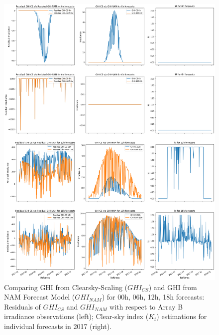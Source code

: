\begin{figure}[htbp]
    \begin{center}
    	\includegraphics[width=\textwidth]{chapter3/fig_ghi_comparison.png}
    	\caption[Comparing GHI from Clearsky-Scaling ($GHI_{CS}$) and GHI from NAM Forecast Model ($GHI_{NAM}$) for 00h, 06h, 12h, 18h forecasts in 2017]{Comparing GHI from Clearsky-Scaling ($GHI_{CS}$) and GHI from NAM Forecast Model ($GHI_{NAM}$) for 00h, 06h, 12h, 18h forecasts: Residuals of $GHI_{CS}$ and $GHI_{NAM}$ with respect to Array B irradiance observations (left); Clear-sky index ($K_t$) estimations for individual forecasts in 2017 (right).}
    	\label{fig:fig_ghi_comparison}
    \end{center}
\end{figure}

